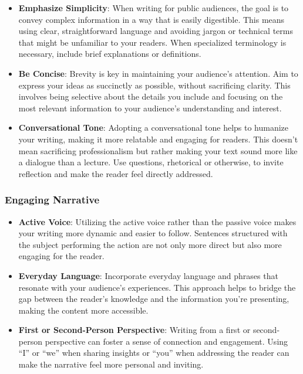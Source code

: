 \documentclass[
]{book}
\begin{document}
\begin{itemize}
\item
  \textbf{Emphasize Simplicity}: When writing for public audiences, the goal is to convey complex information in a way that is easily digestible. This means using clear, straightforward language and avoiding jargon or technical terms that might be unfamiliar to your readers. When specialized terminology is necessary, include brief explanations or definitions.
\item
  \textbf{Be Concise}: Brevity is key in maintaining your audience's attention. Aim to express your ideas as succinctly as possible, without sacrificing clarity. This involves being selective about the details you include and focusing on the most relevant information to your audience's understanding and interest.
\item
  \textbf{Conversational Tone}: Adopting a conversational tone helps to humanize your writing, making it more relatable and engaging for readers. This doesn't mean sacrificing professionalism but rather making your text sound more like a dialogue than a lecture. Use questions, rhetorical or otherwise, to invite reflection and make the reader feel directly addressed.
\end{itemize}

\hypertarget{engaging-narrative}{%
\subsubsection{Engaging Narrative}\label{engaging-narrative}}

\begin{itemize}
\item
  \textbf{Active Voice}: Utilizing the active voice rather than the passive voice makes your writing more dynamic and easier to follow. Sentences structured with the subject performing the action are not only more direct but also more engaging for the reader.
\item
  \textbf{Everyday Language}: Incorporate everyday language and phrases that resonate with your audience's experiences. This approach helps to bridge the gap between the reader's knowledge and the information you're presenting, making the content more accessible.
\item
  \textbf{First or Second-Person Perspective}: Writing from a first or second-person perspective can foster a sense of connection and engagement. Using ``I'' or ``we'' when sharing insights or ``you'' when addressing the reader can make the narrative feel more personal and inviting.
\end{itemize}
\end{document}
